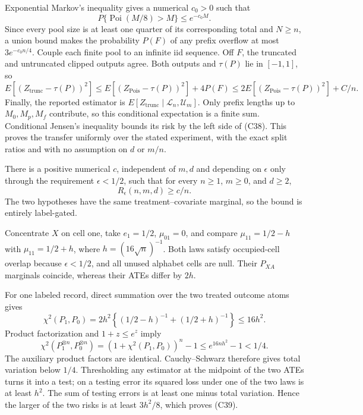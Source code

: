 Exponential Markov's inequality gives a numerical \(c_0>0\) such that
\[
 P\{\operatorname{Poi}(M/8)>M\}\le e^{-c_0M}.                     \tag{C37}
\]
Since every pool size is at least one quarter of its corresponding total and \(N\ge n\), a union bound makes the probability \(P(F)\) of any prefix overflow at most \(3e^{-c_0n/4}\).  Couple each finite pool to an infinite iid sequence.  Off \(F\), the truncated and untruncated clipped outputs agree.  Both outputs and \(\tau(P)\) lie in \([-1,1]\), so
\[
 E[(Z_{\mathrm{trunc}}-\tau(P))^2]
 \le E[(Z_{\mathrm{Pois}}-\tau(P))^2]+4P(F)
 \le2E[(Z_{\mathrm{Pois}}-\tau(P))^2]+C/n.                        \tag{C38}
\]
Finally, the reported estimator is \(E[Z_{\mathrm{trunc}}\mid\mathcal L_n,\mathcal U_m]\).  Only prefix lengths up to \(M_0,M_p,M_f\) contribute, so this conditional expectation is a finite sum.  Conditional Jensen's inequality bounds its risk by the left side of (C38).  This proves the transfer uniformly over the stated experiment, with the exact split ratios and with no assumption on \(d\) or \(m/n\).

There is a positive numerical \(c\), independent of \(m,d\) and depending on \(\epsilon\) only through the requirement \(\epsilon<1/2\), such that for every \(n\ge1\), \(m\ge0\), and \(d\ge2\),
\[
 R_\epsilon(n,m,d)\ge c/n.                                        \tag{C39}
\]
The two hypotheses have the same treatment--covariate marginal, so the bound is entirely label-gated.

Concentrate \(X\) on cell one, take \(e_1=1/2\), \(\mu_{01}=0\), and compare \(\mu_{11}=1/2-h\) with \(\mu_{11}=1/2+h\), where \(h=(16\sqrt n)^{-1}\).  Both laws satisfy occupied-cell overlap because \(\epsilon<1/2\), and all unused alphabet cells are null.  Their \(P_{XA}\) marginals coincide, whereas their ATEs differ by \(2h\).

For one labeled record, direct summation over the two treated outcome atoms gives
\[
 \chi^2(P_1,P_0)=2h^2\left\{(1/2-h)^{-1}+(1/2+h)^{-1}\right\}
 \le16h^2.                                                         \tag{C40}
\]
Product factorization and \(1+z\le e^z\) imply
\[
 \chi^2(P_1^{\otimes n},P_0^{\otimes n})
 =(1+\chi^2(P_1,P_0))^n-1\le e^{16nh^2}-1<1/4.                    \tag{C41}
\]
The auxiliary product factors are identical.  Cauchy--Schwarz therefore gives total variation below \(1/4\).  Thresholding any estimator at the midpoint of the two ATEs turns it into a test; on a testing error its squared loss under one of the two laws is at least \(h^2\).  The sum of testing errors is at least one minus total variation.  Hence the larger of the two risks is at least \(3h^2/8\), which proves (C39).

